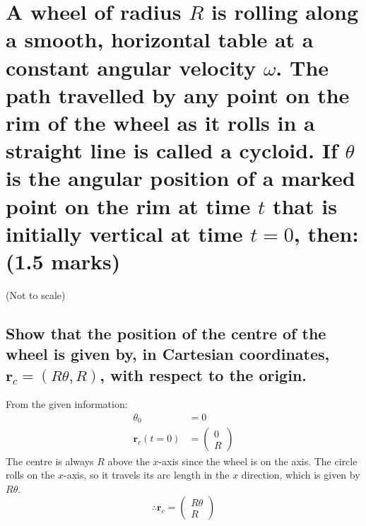 \documentclass[a4paper]{scrartcl}
\begin{document}
\section{A wheel of radius \(R\) is rolling along a smooth, horizontal table at a constant angular velocity \(\omega\). The path travelled by any point on the rim of the wheel as it rolls in a straight line is called a cycloid. If \(\theta\) is the angular position of a marked point on the rim at time \(t\) that is initially vertical at time \(t = 0\), then: (1.5 marks)}
\begin{center}

    (Not to scale)
\end{center}

\subsection{Show that the position of the centre of the wheel is given by, in Cartesian coordinates, \(\mathbf{r}_c = (R \theta, R)\), with respect to the origin.}
From the given information:
\begin{align*}
    \theta_0 &= 0 \\
    \mathbf{r}_c(t = 0) &= \begin{pmatrix} 0 \\ R \end{pmatrix}
\end{align*}
The centre is always \(R\) above the \(x\)-axis since the wheel is on the axis. The circle rolls on the \(x\)-axis, so it travels its arc length in the \(x\) direction, which is given by \(R \theta\).
\[\therefore \mathbf{r}_c = \begin{pmatrix} R \theta \\ R \end{pmatrix}\]
\end{document}
